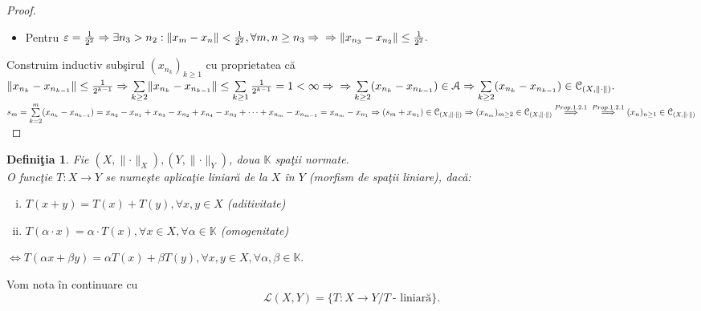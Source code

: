 \documentclass[ a4paper, 12pt]{report}
\newtheorem{definition}{\bf Defini\c tia}[section]
\theoremstyle{remark}
\numberwithin{equation}{section}
\begin{document}
\begin{proof}
\begin{itemize}
\item Pentru $\varepsilon=\frac{1}{2^2} \Rightarrow
\exists n_3 > n_2: \lVert x_m - x_n \rVert < \frac{1}{2^2}, \forall m,n \geq n_3 \Rightarrow \\
\Rightarrow \lVert x_{n_3}-x_{n_2}\rVert \leq \frac{1}{2^2}.$
\end{itemize}
Construim inductiv sub\c sirul $(x_{n_k})_{k \geq 1}$ cu proprietatea c\u a \\
 $\lVert x_{n_k} - x_{n_{k-1}} \rVert \leq \frac{1}{2^{k-1}} \Rightarrow \sum\limits_{k \geq 2} \lVert x_{n_k} - x_{n_{k-1}} \rVert \leq \sum\limits_{k \geq 1}\frac{1}{2^{k-1}} = 1 < \infty \Rightarrow \\
 \Rightarrow \sum\limits_{k \geq 2} (x_{n_k} - x_{n_{k-1}}) \in \mathcal{A} \Rightarrow \sum\limits_{k \geq 2}(x_{n_k} - x_{n_{k-1}}) \in \mathcal{C}_{(X, \lVert \cdot \rVert)}.$\\
 $s_m = \sum\limits_{k=2}^{m}(x_{n_k} - x_{n_{k-1}}) = x_{n_2} - x_{n_1} + x_{n_3} - x_{n_2} + x_{n_4} - x_{n_3} + \cdots + x_{n_m}- x_{n_{m-1}} = x_{n_m} - x_{n_1} \Rightarrow (s_m + x_{n_1}) \in \mathcal{C}_{(X, \Vert \cdot \rVert)} \Rightarrow (x_{n_m})_{m \geq 2} \in \mathcal{C}_{(X, \lVert \cdot \rVert)} \stackrel{Prop.1.2.1}{\Longrightarrow} \\
 \stackrel{Prop.1.2.1}{\Longrightarrow}
 (x_n)_{n \geq 1} \in \mathcal{C}_{(X, \Vert \cdot \rVert)} $
\end{proof}
\begin{definition}
Fie $(X,\lVert \cdot \rVert_{X}), (Y,\lVert \cdot \rVert_{Y})$, doua $\mathbb{K}$ spa\c tii normate.\\
O func\c tie $T : X \rightarrow Y$ se nume\c ste aplica\c tie liniar\u a de la $X$ \^in $Y$ (morfism de spa\c tii liniare), dac\u a:\\
\begin{enumerate}[(i)]
\item $T(x+y) = T(x) + T(y), \forall x,y \in X$ (aditivitate)
\item $T(\alpha \cdot x) = \alpha \cdot T(x), \forall x \in X, \forall \alpha \in \mathbb{K}$ (omogenitate)
\end{enumerate} $\Leftrightarrow T(\alpha x + \beta y) = \alpha T(x) + \beta T(y), \forall x,y \in X, \forall \alpha,\beta \in \mathbb{K}.$
\end{definition}
Vom nota \^in continuare cu
\[ \mathcal{L}(X,Y) = \{ T: X \rightarrow Y / T\ \mbox{- liniar\u a} \}.\]
\end{document}
